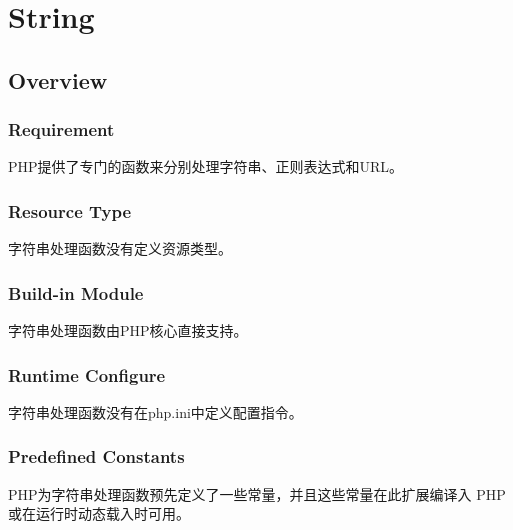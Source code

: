 \part{String}


\chapter{Overview}


\section{Requirement}


PHP提供了专门的函数来分别处理字符串、正则表达式和URL。

\section{Resource Type}

字符串处理函数没有定义资源类型。


\section{Build-in Module}

字符串处理函数由PHP核心直接支持。

\section{Runtime Configure}

字符串处理函数没有在php.ini中定义配置指令。




\section{Predefined Constants}

PHP为字符串处理函数预先定义了一些常量，并且这些常量在此扩展编译入 PHP 或在运行时动态载入时可用。


